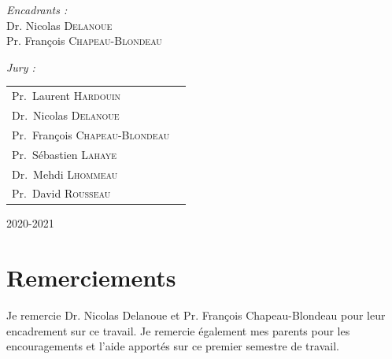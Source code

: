 \documentclass[12pt,a4paper]{report}
\newcommand\frontmatter{
    \cleardoublepage
    \pagenumbering{roman}
}
\newcommand\mainmatter{
    \cleardoublepage
    \pagenumbering{arabic}
}
\begin{document}
\begin{titlepage}
\begin{center}
\begin{minipage}{0.4\textwidth}
\begin{flushright}
          \emph{Encadrants :}\\
          Dr. Nicolas \textsc{Delanoue}\\
          Pr. François \textsc{Chapeau-Blondeau}\\
          \end{flushright}
      \end{minipage}
      \vfill
      \normalsize
      \emph{Jury :}
      \begin{tabular}{lc}
          Pr.~Laurent \textsc{Hardouin}\\
          Dr.~Nicolas \textsc{Delanoue}\\
          Pr.~François \textsc{Chapeau-Blondeau}\\
          Pr.~Sébastien \textsc{Lahaye}\\
          Dr.~Mehdi  \textsc{Lhommeau}\\
          Pr.~David  \textsc{Rousseau}\\
      \end{tabular}

      \vspace{2cm}
      
      {2020-2021}
    \end{center}
\end{titlepage}

\frontmatter

\section*{Remerciements}
Je remercie Dr. Nicolas Delanoue et Pr. François Chapeau-Blondeau pour leur encadrement sur ce travail. Je remercie également mes parents pour les encouragements et l'aide apportés sur ce premier semestre de travail.

\pagebreak
\tableofcontents

\pagebreak
\listoffigures

\mainmatter









\begin{appendix}




\end{appendix}
% 
\end{document}
